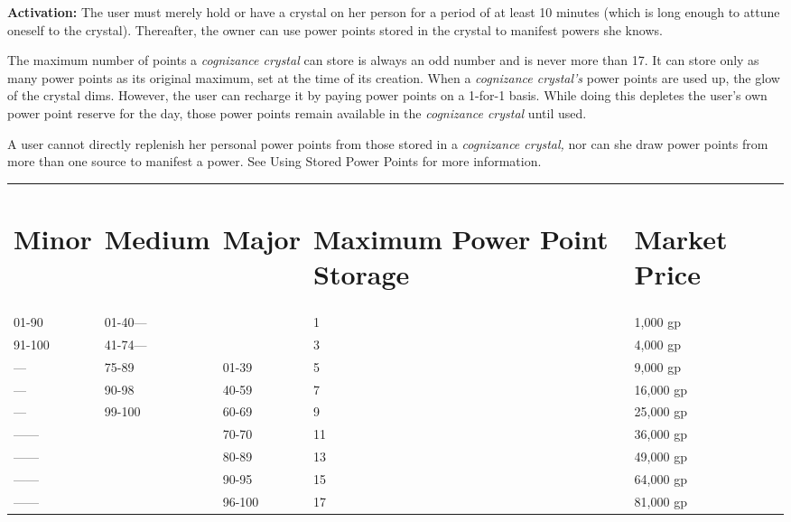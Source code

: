 \documentclass{article}
\begin{document}
\textbf{Activation:} The user must merely hold or have a crystal on her person 
for a period of at least 10 minutes (which is long enough to attune oneself to 
the crystal). Thereafter, the owner can use power points stored in the crystal 
to manifest powers she knows.

The maximum number of points a \textit{cognizance crystal }can store is always 
an odd number and is never more than 17. It can store only as many power points 
as its original maximum, set at the time of its creation. When a \textit{cognizance 
crystal's }power points are used up, the glow of the crystal dims. However, the 
user can recharge it by paying power points on a 1-for-1 basis. While doing this 
depletes the user's own power point reserve for the day, those power points remain 
available in the \textit{cognizance crystal }until used.

A user cannot directly replenish her personal power points from those stored in 
a \textit{cognizance crystal, }nor can she draw power points from more than one 
source to manifest a power. See Using Stored Power Points for more information.

\begin{tabular}{|>{\raggedright}p{33pt}|>{\raggedright}p{34pt}|>{\raggedright}p{28pt}|>{\raggedright}p{74pt}|>{\raggedright}p{60pt}|}
\hline
\multicolumn{5}{|p{232pt}|}{T\textbf{able: Cognizance Crystals}}\tabularnewline
\hline
\section*{M\textbf{inor}} & \section*{M\textbf{edium}} & \section*{M\textbf{ajor}} & \section*{M\textbf{aximum 
Power Point Storage}} & \section*{M\textbf{arket Price}}\tabularnewline
\hline
01-90 & 01-40--- &  & 1 & 1,000 gp\tabularnewline
\hline
91-100 & 41-74--- &  & 3 & 4,000 gp\tabularnewline
\hline
--- & 75-89 & 01-39 & 5 & 9,000 gp\tabularnewline
\hline
--- & 90-98 & 40-59 & 7 & 16,000 gp\tabularnewline
\hline
--- & 99-100 & 60-69 & 9 & 25,000 gp\tabularnewline
\hline
------ &  & 70-70 & 11 & 36,000 gp\tabularnewline
\hline
------ &  & 80-89 & 13 & 49,000 gp\tabularnewline
\hline
------ &  & 90-95 & 15 & 64,000 gp\tabularnewline
\hline
------ &  & 96-100 & 17 & 81,000 gp\tabularnewline
\hline
\end{tabular}
\end{document}
